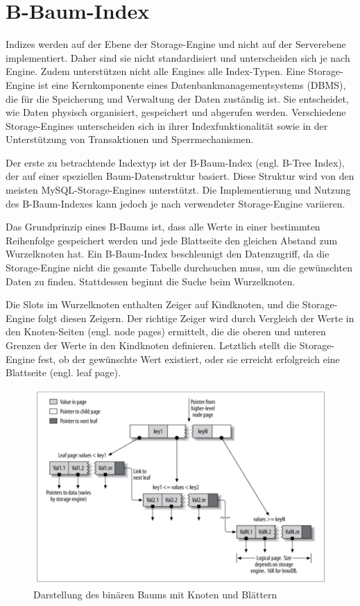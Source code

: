 \section{B-Baum-Index}

Indizes werden auf der Ebene der Storage-Engine und nicht auf der Serverebene implementiert.
Daher sind sie nicht standardisiert und unterscheiden sich je nach Engine.
Zudem unterstützen nicht alle Engines alle Index-Typen.
Eine Storage-Engine ist eine Kernkomponente eines Datenbankmanagementsystems (DBMS), die für die Speicherung und Verwaltung der Daten zuständig ist.
Sie entscheidet, wie Daten physisch organisiert, gespeichert und abgerufen werden.
Verschiedene Storage-Engines unterscheiden sich in ihrer Indexfunktionalität sowie in der Unterstützung von Transaktionen und Sperrmechanismen.

Der erste zu betrachtende Indextyp ist der B-Baum-Index (engl. B-Tree Index), der auf einer speziellen Baum-Datenstruktur basiert.
Diese Struktur wird von den meisten MySQL-Storage-Engines unterstützt.
Die Implementierung und Nutzung des B-Baum-Indexes kann jedoch je nach verwendeter Storage-Engine variieren.

Das Grundprinzip eines B-Baums ist, dass alle Werte in einer bestimmten Reihenfolge gespeichert werden und jede Blattseite den gleichen Abstand zum Wurzelknoten hat.
Ein B-Baum-Index beschleunigt den Datenzugriff, da die Storage-Engine nicht die gesamte Tabelle durchsuchen muss, um die gewünschten Daten zu finden.
Stattdessen beginnt die Suche beim Wurzelknoten.

Die Slots im Wurzelknoten enthalten Zeiger auf Kindknoten, und die Storage-Engine folgt diesen Zeigern.
Der richtige Zeiger wird durch Vergleich der Werte in den Knoten-Seiten (engl. node pages) ermittelt, die die oberen und unteren Grenzen der Werte in den Kindknoten definieren.
Letztlich stellt die Storage-Engine fest, ob der gewünschte Wert existiert, oder sie erreicht erfolgreich eine Blattseite (engl. leaf page).

\begin{figure}[!ht]
    \centering
    \includegraphics[width=.8\textwidth]{PNGs/Index/B_Tree_Visualisation}
    \caption[Binärbaum - Grafik]{Darstellung des binären Baums mit Knoten und Blättern}
    \label{fig:b-tree-visualisation}
\end{figure}

